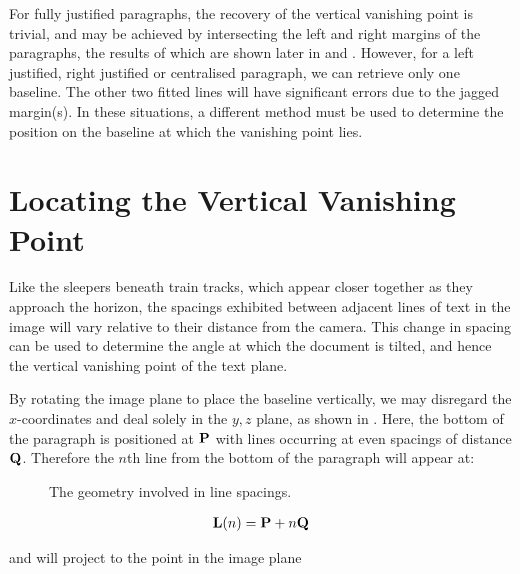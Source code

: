 { \newbyjoey

For fully justified paragraphs, the recovery of the vertical vanishing point is trivial, and may be achieved by intersecting the left and right margins of the paragraphs, the results of which are shown later in  and .
However, for a left justified, right justified or centralised paragraph, we can retrieve only one baseline.  The other two fitted lines will have significant errors due to the jagged margin(s).
In these situations, a different method must be used to determine the position on the baseline at which the vanishing point lies.






\section{Locating the Vertical Vanishing Point} \label{sec-last-vertvanish}

Like the sleepers beneath train tracks, which appear closer together as they
approach the horizon, the spacings exhibited between adjacent lines of text in
the image will vary relative to their distance from the camera.  This change in
spacing can be used to determine the angle at which the document is tilted, and
hence the vertical vanishing point of the text plane.

By rotating the image plane to place the baseline vertically, we may disregard the $x$-coordinates and deal solely in the $y,z$ plane, as shown in .
Here, the bottom of the paragraph is positioned at ${ \bf P }$ with lines occurring at even spacings of distance ${ \bf Q }$.  Therefore the $n$th line from the bottom of the paragraph will appear at:

\begin{figure}[t]
\centering
\begin{center}
\caption{The geometry involved in line spacings.}
\label{zyspacings}
\end{center}
\end{figure}

\begin{eqnarray}
{ \bf L }(n) = { \bf P }+n{ \bf Q }
\end{eqnarray}

{\parindent 0mm
and will project to the point in the image plane
}

}
